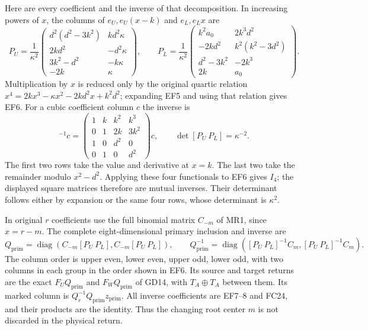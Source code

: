 Here are every coefficient and the inverse of that
decomposition. In increasing powers of $x$, the
columns of $e_U,e_U(x-k)$ and $e_L,e_Lx$ are
\begin{equation}
 P_U=\frac1{\kappa^2}\begin{pmatrix}
 d^2(d^2-3k^2)&kd^2\kappa\\2kd^2&-d^2\kappa\\
 3k^2-d^2&-k\kappa\\-2k&\kappa
 \end{pmatrix},\qquad
 P_L=\frac1{\kappa^2}\begin{pmatrix}
 k^2a_0&2k^3d^2\\-2kd^2&k^2(k^2-3d^2)\\
 d^2-3k^2&-2k^3\\2k&a_0
 \end{pmatrix}.
 \tag{EF6}
\end{equation}
Multiplication by $x$ is reduced only by the original
quartic relation
$x^4=2kx^3-\kappa x^2-2kd^2x+k^2d^2$;
expanding EF5 and using that relation gives EF6.
For a cubic coefficient column $c$ the inverse is
\begin{equation}
 [P_U\ P_L]^{-1}c=
 \begin{pmatrix}1&k&k^2&k^3\\0&1&2k&3k^2\\
 1&0&d^2&0\\0&1&0&d^2\end{pmatrix}c,
 \qquad\det[P_U\ P_L]=\kappa^{-2}.
 \tag{EF7}
\end{equation}
The first two rows take the value and derivative at $x=k$.
The last two take the remainder modulo $x^2-d^2$.
Applying these four functionals to EF6 gives $I_4$;
the displayed square matrices therefore are mutual
inverses. Their determinant follows either by expansion
or the same four rows, whose determinant is $\kappa^2$.

In original $r$ coefficients use the full binomial
matrix $C_{-m}$ of MR1, since $x=r-m$. The complete
eight-dimensional primary inclusion and inverse are
\begin{equation}
Q_{\mathrm{prim}}=
 \operatorname{diag}(C_{-m}[P_U\ P_L],C_{-m}[P_U\ P_L]),\qquad
Q_{\mathrm{prim}}^{-1}=
 \operatorname{diag}([P_U\ P_L]^{-1}C_m,[P_U\ P_L]^{-1}C_m).
 \tag{EF8}
\end{equation}
The column order is upper even, lower even, upper odd,
lower odd, with two columns in each group in the order
shown in EF6. Its source and target returns are the exact
$F_UQ_{\mathrm{prim}}$ and $F_WQ_{\mathrm{prim}}$ of
GD14, with $T_A\oplus T_A$ between them. Its marked
column is $Q_r^{-1}Q_{\mathrm{prim}}z_{\mathrm{prim}}$.
All inverse coefficients are EF7--8 and FC24, and
their products are the identity. Thus the changing
root center $m$ is not discarded in the physical return.

